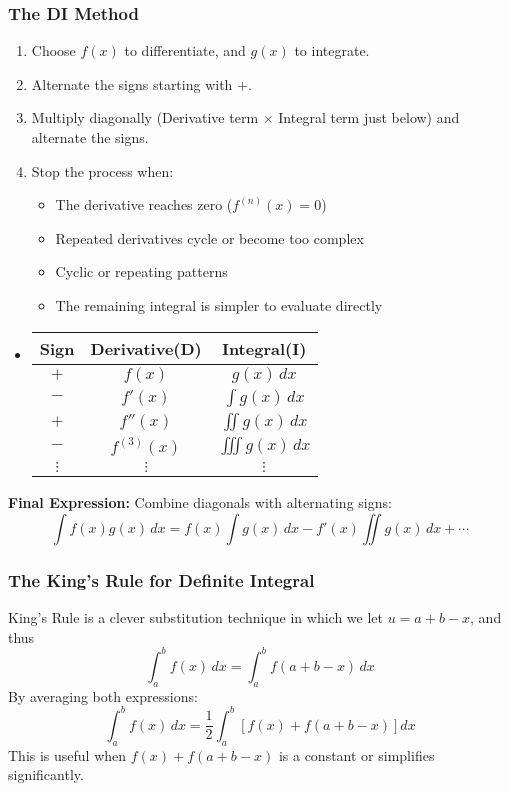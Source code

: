 \documentclass[11pt]{article}
\begin{document}
\subsubsection{The DI Method}
\begin{enumerate}
    \item Choose $f(x)$ to differentiate, and $g(x)$ to integrate.
    \item Alternate the signs starting with $+$.
    \item Multiply diagonally (Derivative term $\times$ Integral term just below) and alternate the signs.
    \item Stop the process when:
        \begin{itemize}
            \item The derivative reaches zero ($f^{(n)}(x) = 0$)
            \item Repeated derivatives cycle or become too complex
            \item Cyclic or repeating patterns
            \item The remaining integral is simpler to evaluate directly
        \end{itemize}
\end{enumerate}
\begin{itemize}
    \renewcommand{\labelitemi}{~}
    \item 
        \renewcommand{\arraystretch}{2}
        \begin{tabular}{c|c|c}
            \textbf{Sign} & \textbf{Derivative(D)} & \textbf{Integral(I)} \\
            \hline
            $+$ \qquad& $f(x)$         \qquad& $ g(x) \, dx$ \\
            $-$ \qquad& $f'(x)$        \qquad& $\int g(x) \, dx$ \\
            $+$ \qquad& $f''(x)$       \qquad& $\iint g(x) \, dx$ \\
            $-$ \qquad& $f^{(3)}(x)$   \qquad& $\iiint g(x) \, dx$ \\
            $\vdots$ & $\vdots$ & $\vdots$ \\
        \end{tabular}
\end{itemize}
\textbf{Final Expression:} Combine diagonals with alternating signs:
\[
    \int f(x) g(x) \, dx = f(x) \int g(x)\,dx - f'(x) \iint g(x)\,dx + \cdots
\]
\subsubsection{The King's Rule for Definite Integral}
King's Rule is a clever substitution technique in which we let $u=a+b-x$, and thus
\[
    \boxed{
        \int_a^b f(x)\,dx = \int_a^b f(a + b - x)\,dx
    }
\]By averaging both expressions:
\[
    \int_a^b f(x)\,dx = \frac{1}{2} \int_a^b \left[ f(x) + f(a + b - x) \right] dx
\]This is useful when $f(x) + f(a + b - x)$ is a constant or simplifies significantly.
\end{document}
